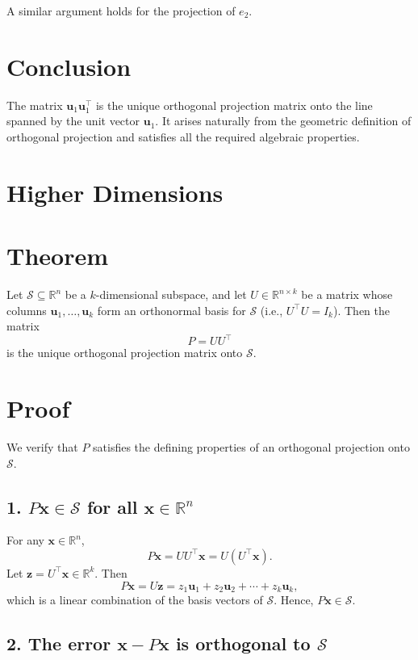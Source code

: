 A similar argument holds for the projection of $e_2$.

\section*{Conclusion}

The matrix $ \mathbf{u}_1 \mathbf{u}_1^\top $ is the unique orthogonal projection matrix onto the line spanned by the unit vector $ \mathbf{u}_1 $. It arises naturally from the geometric definition of orthogonal projection and satisfies all the required algebraic properties.

\section{Higher Dimensions}

\section*{Theorem}
Let $ \mathcal{S} \subseteq \mathbb{R}^n $ be a $ k $-dimensional subspace, and let $ U \in \mathbb{R}^{n \times k} $ be a matrix whose columns $ \mathbf{u}_1, \dots, \mathbf{u}_k $ form an orthonormal basis for $ \mathcal{S} $ (i.e., $ U^\top U = I_k $).  
Then the matrix
\[
P = U U^\top
\]
is the unique orthogonal projection matrix onto $ \mathcal{S} $.

\section*{Proof}

We verify that $ P $ satisfies the defining properties of an orthogonal projection onto $ \mathcal{S} $.

\subsection*{1. $ P\mathbf{x} \in \mathcal{S} $ for all $ \mathbf{x} \in \mathbb{R}^n $}

For any $ \mathbf{x} \in \mathbb{R}^n $,
\[
P\mathbf{x} = U U^\top \mathbf{x} = U (U^\top \mathbf{x}).
\]
Let $ \mathbf{z} = U^\top \mathbf{x} \in \mathbb{R}^k $. Then
\[
P\mathbf{x} = U \mathbf{z} = z_1 \mathbf{u}_1 + z_2 \mathbf{u}_2 + \cdots + z_k \mathbf{u}_k,
\]
which is a linear combination of the basis vectors of $ \mathcal{S} $. Hence, $ P\mathbf{x} \in \mathcal{S} $.

\subsection*{2. The error $ \mathbf{x} - P\mathbf{x} $ is orthogonal to $ \mathcal{S} $}

